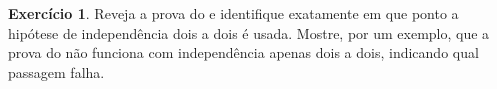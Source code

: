 \documentclass[12pt,portuguese]{article}
\theoremstyle{definition}
\theoremstyle{plainexercise}
\theoremstyle{starredexercise}
\newtheorem{starredexercise}[exercise]{Exercício}
\theoremstyle{definition}
\begin{document}
\begin{starredexercise}\label{exercise:dois-a-dois}
Reveja a prova do  e identifique exatamente em que ponto a
hipótese de independência dois a dois é usada. Mostre, por um exemplo, que a
prova do  não funciona com independência apenas dois a
dois, indicando qual passagem falha.
\end{starredexercise}



\end{document}
